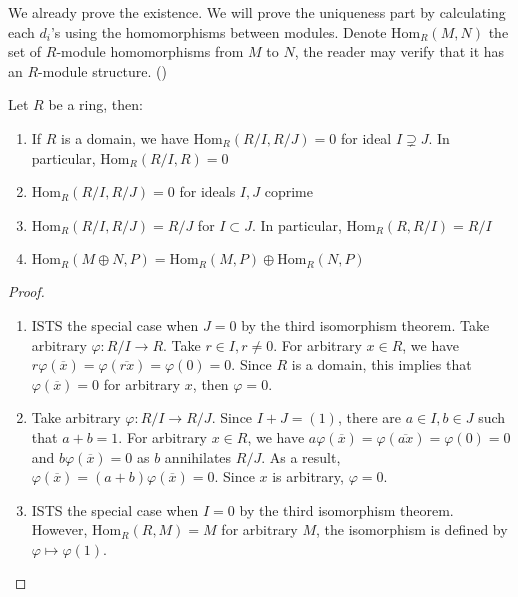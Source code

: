 \documentclass{note-eng}
\begin{document}
We already prove the existence. We will prove the uniqueness part by calculating each $d_i$'s using the homomorphisms between modules. Denote $\mathrm{Hom}_{R}(M, N)$ the set of $R$-module homomorphisms from $M$ to $N$, the reader may verify that it has an $R$-module structure. (\TODO)

\begin{lemma}
    Let $R$ be a ring, then:
    \begin{enumerate}
        \item If $R$ is a domain, we have $\mathrm{Hom}_{R}(R / I, R / J) = 0$ for ideal $I \supsetneq J$. In particular, $\mathrm{Hom}_{R}(R / I, R) = 0$
        \item $\mathrm{Hom}_{R}(R / I, R / J) = 0$ for ideals $I, J$ coprime
        \item $\mathrm{Hom}_{R}(R / I, R / J) = R / J$ for $I \subset J$. In particular, $\mathrm{Hom}_{R}(R, R / I) = R / I$
        \item $\mathrm{Hom}_{R}(M \oplus N, P) = \mathrm{Hom}_{R}(M, P) \oplus \mathrm{Hom}_{R}(N, P)$
    \end{enumerate}
\end{lemma}

\begin{proof}
    \begin{enumerate}
        \item ISTS the special case when $J = 0$ by the third isomorphism theorem. Take arbitrary $\varphi: R / I \rightarrow R$. Take $r \in I, r \ne 0$. For arbitrary $x \in R$, we have $r \varphi (\overline{x}) = \varphi(\overline{rx}) = \varphi(0) = 0$. Since $R$ is a domain, this implies that $\varphi(\overline{x}) = 0$ for arbitrary $x$, then $\varphi = 0$.
        \item Take arbitrary $\varphi: R / I \rightarrow R / J$. Since $I + J = (1)$, there are $a \in I, b \in J$ such that $a + b = 1$. For arbitrary $x \in R$, we have $a \varphi(\overline{x}) = \varphi(\overline{ax}) = \varphi(0) = 0$ and $b \varphi(\overline{x}) = 0$ as $b$ annihilates $R / J$. As a result, $\varphi(\overline{x}) = (a + b)\varphi(\overline{x}) = 0$. Since $x$ is arbitrary, $\varphi = 0$.
        \item ISTS the special case when $I = 0$ by the third isomorphism theorem. However, $\mathrm{Hom}_{R}(R, M) = M$ for arbitrary $M$, the isomorphism is defined by $\varphi \mapsto \varphi(1)$.
    \end{enumerate}
\end{proof}
\end{document}
